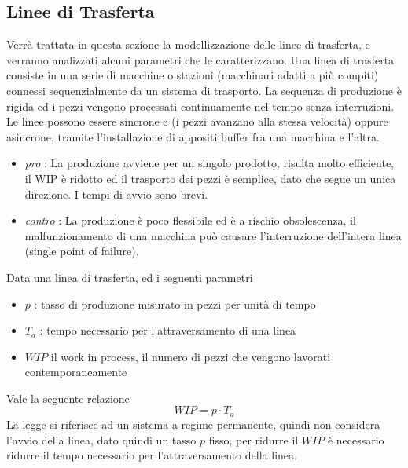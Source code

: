 \documentclass[10pt, letterpaper]{report}
\begin{document}
\subsection{Linee di Trasferta}
Verrà trattata in questa sezione la modellizzazione delle linee di trasferta, e verranno analizzati 
alcuni parametri che le caratterizzano. Una linea di trasferta consiste in una serie di macchine o stazioni 
(macchinari adatti a più compiti) connessi sequenzialmente da un sistema di trasporto. La sequenza di produzione 
è rigida ed i pezzi vengono processati continuamente nel tempo senza interruzioni. Le linee possono essere 
sincrone e (i pezzi avanzano alla stessa velocità) oppure asincrone, tramite l'installazione di appositi 
buffer fra una macchina e l'altra.\begin{itemize}
    \item \textit{pro} : La produzione avviene per un singolo prodotto, risulta molto efficiente, il WIP è 
    ridotto ed il trasporto dei pezzi è semplice, dato che segue un unica direzione. I tempi di avvio sono brevi. 
    \item \textit{contro} : La produzione è poco flessibile ed è a rischio obsolescenza, il malfunzionamento 
    di una macchina può causare l'interruzione dell'intera linea (single point of failure).
\end{itemize}
 Data una linea di trasferta, ed i seguenti parametri \begin{itemize}
    \item $p$ : tasso di produzione misurato in pezzi per unità di tempo 
    \item $T_a$ : tempo necessario per l'attraversamento di una linea 
    \item $WIP$ il work in process,  il numero di pezzi che vengono 
    lavorati contemporaneamente
\end{itemize}
Vale la seguente relazione $$ WIP = p\cdot T_a$$
La legge si riferisce ad un sistema a regime permanente, quindi non considera l'avvio della linea, dato quindi 
un tasso $p$ fisso, per ridurre il $WIP$ è necessario ridurre il  tempo necessario 
per l'attraversamento della linea. 
\end{document}
